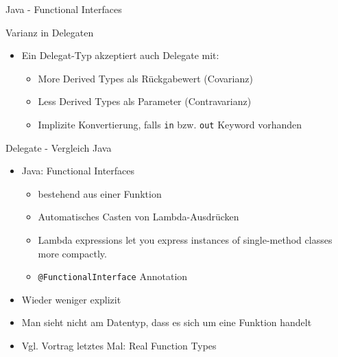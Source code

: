 \documentclass[11pt]{beamer}
\begin{document}
\begin{frame}{Java - Functional Interfaces}

\end{frame}

\begin{frame}{Varianz in Delegaten}
	\begin{itemize}
	 	\item Ein Delegat-Typ akzeptiert auch Delegate mit:
	 	\begin{itemize}
	 		\item \glqq More Derived Types\grqq{} als Rückgabewert (Covarianz)
	 		\item \glqq Less Derived Types\grqq{} als Parameter (Contravarianz)
	 		\item Implizite Konvertierung, falls \texttt{in} bzw. \texttt{out} Keyword vorhanden
	 	\end{itemize}
	\end{itemize}
\end{frame}

\begin{frame}{Delegate - Vergleich Java}
	\begin{itemize}
		\item Java: Functional Interfaces
		\begin{itemize}
			\item bestehend aus einer Funktion
			\item Automatisches Casten von Lambda-Ausdrücken
			\item \glqq Lambda expressions let you express instances of single-method classes more compactly.\grqq
			\item \texttt{@FunctionalInterface} Annotation		
		\end{itemize}
		\item Wieder weniger explizit
		\item Man sieht nicht am Datentyp, dass es sich um eine Funktion handelt
		\item Vgl. Vortrag letztes Mal: \glqq Real Function Types\grqq
	\end{itemize}
\end{frame}

\end{document}
